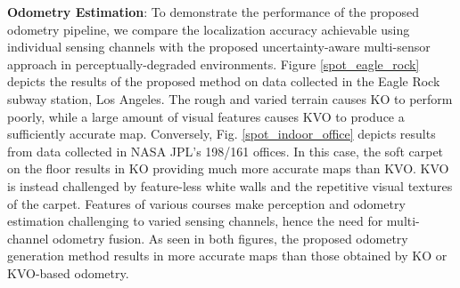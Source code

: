 \documentclass[letterpaper, 10pt, conference]{ieeeconf}      %
\newcommand{\ph}[1]{{\textbf{#1}:}} %
\newcommand{\rev}[1]{{\color{blue}#1}} %
\begin{document}











\ph{Odometry Estimation}
To demonstrate the performance of the proposed odometry pipeline, we compare the localization accuracy achievable using individual sensing channels with the proposed uncertainty-aware multi-sensor approach in perceptually-degraded environments. Figure \ref{spot_eagle_rock} depicts the results of the proposed method on data collected in the Eagle Rock subway station, Los Angeles. The rough and \rev{varied} terrain causes KO to perform poorly, while a large amount of visual features causes KVO to produce a sufficiently accurate map. Conversely, Fig. \ref{spot_indoor_office} depicts results from data collected in NASA JPL's 198/161 offices. In this case, the soft carpet on the floor results in KO providing much more accurate maps than KVO.  KVO is instead challenged by feature-less white walls and the repetitive visual textures of the carpet. Features of various courses make perception and odometry estimation challenging to \rev{varied} sensing channels, hence the need for multi-channel odometry fusion. As seen in both figures, the proposed odometry generation method results in more accurate maps than those obtained by KO or KVO-based odometry.




\end{document}

